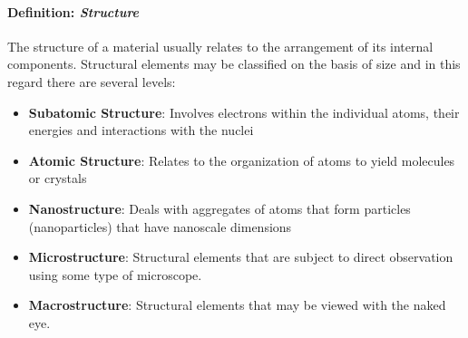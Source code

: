 \documentclass{article}
\begin{document}
\paragraph{Definition: \textit{Structure}} The structure of a material usually relates to the arrangement of its internal components. Structural elements may be classified on the basis of size and in this regard there are several levels: \begin{itemize}
    \item \textbf{Subatomic Structure}: Involves electrons within the individual atoms, their energies and interactions with the nuclei
    \item \textbf{Atomic Structure}: Relates to the organization of atoms to yield molecules or crystals
    \item \textbf{Nanostructure}: Deals with aggregates of atoms that form particles (nanoparticles) that have nanoscale dimensions
    \item \textbf{Microstructure}: Structural elements that are subject to direct observation using some type of microscope.
    \item \textbf{Macrostructure}: Structural elements that may be viewed with the naked eye.
\end{itemize}

\end{document}
